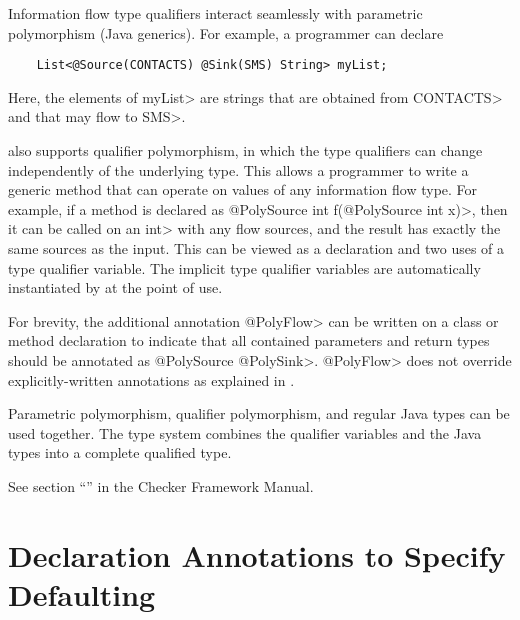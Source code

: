 Information flow type qualifiers interact seamlessly with parametric polymorphism (Java
generics).  For example, a programmer can declare

\begin{Verbatim}
    List<@Source(CONTACTS) @Sink(SMS) String> myList;
\end{Verbatim}
\noindent
Here, the elements of \<myList> are strings
that are obtained from \<CONTACTS> and that may flow to \<SMS>.

\TheFlowChecker also supports qualifier polymorphism, in
which the type qualifiers can change independently of the underlying type.
This allows a programmer to write a generic method that can operate on values of
any information flow type.
For example, if a method is declared as
\<@PolySource int f(@PolySource int x)>, then it can be called on an \<int>
with any flow sources, and the result has exactly the same sources as the
input.  This can be viewed as a declaration and two uses of a type
qualifier variable.  The implicit type qualifier variables are
automatically instantiated by \theFlowChecker at the point of use.

For brevity,
the additional
annotation \<@PolyFlow> can be written on a class or method declaration to indicate that
all contained parameters and return types should be annotated as \<@PolySource
@PolySink>.  \<@PolyFlow> does not override explicitly-written annotations as explained
in .


Parametric polymorphism, qualifier polymorphism, and regular Java types can
be used together.  The type system combines the
qualifier variables and the Java types into a complete qualified type.

See section ``'' in the Checker Framework Manual.  




\section{Declaration Annotations to Specify Defaulting\label{sec:addtionalanno}}

